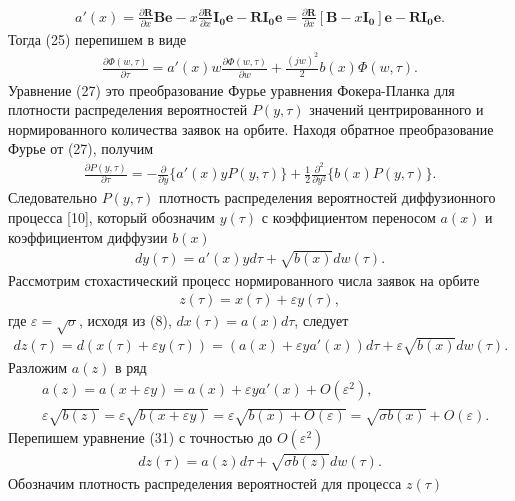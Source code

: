 \begin{align*}
	a'(x)=\frac{\partial \boldsymbol{R}}{\partial x}\boldsymbol{Be}-x\frac{\partial \boldsymbol{R}}{\partial x}\boldsymbol{I_{0}} \boldsymbol{e}-\boldsymbol{RI_{0}e}=\frac{\partial \boldsymbol{R}}{\partial x}[\boldsymbol{B}-x\boldsymbol{I_{0}}] \boldsymbol{e}-\boldsymbol{RI_{0}e}.
\end{align*}
Тогда (25) перепишем в виде
\begin{align}
	\frac{\partial \Phi (w,\tau)}{\partial \tau}=a'(x) w\frac{\partial \Phi (w,\tau)}{\partial w}+\frac{(jw)^2}{2}b(x)\Phi(w,\tau).
\end{align}
Уравнение (27) это преобразование Фурье уравнения Фокера-Планка для плотности распределения вероятностей $P(y, \tau )$ значений центрированного и нормированного количества заявок на орбите. Находя обратное преобразование Фурье от (27), получим
\begin{align}
	\frac{\partial P (y,\tau)}{\partial \tau}=-\frac{\partial}{\partial y}\{a'(x)yP(y,\tau)\} 
	+\frac{1}{2}\frac{\partial^2}{\partial y^2}\{b(x)P(y,\tau)\}.
\end{align}
Следовательно $P (y,\tau)$ плотность распределения вероятностей диффузионного процесса [10], который обозначим $y(\tau)$ с коэффициентом переносом $a(x)$ и коэффициентом диффузии $b(x)$
\begin{align}
	dy(\tau)=a'(x)yd\tau+\sqrt{b(x)}dw(\tau).
\end{align}
Рассмотрим стохастический процесс нормированного числа заявок на орбите
\begin{align}
	z(\tau)=x(\tau)+\varepsilon y(\tau),
\end{align}
где $\varepsilon=\sqrt{\sigma}$, исходя из (8), $dx(\tau)=a(x)d\tau$, следует
\begin{align}
	dz(\tau)=d(x(\tau)+\varepsilon y(\tau))=(a(x)+\varepsilon ya'(x))d\tau+\varepsilon \sqrt{b(x)}dw(\tau).
\end{align}
Разложим $a(z)$ в ряд 
\begin{align*}
	&a(z)=a(x+\varepsilon y)=a(x)+\varepsilon y a'(x)+O(\varepsilon^2),\\
	&\varepsilon\sqrt{b(z)}=\varepsilon\sqrt{b(x+\varepsilon y)}=\varepsilon\sqrt{b(x)+O(\varepsilon)}=\sqrt{\sigma b(x)}+O(\varepsilon).
\end{align*}
Перепишем уравнение (31) с точностью до $O(\varepsilon^2)$
\begin{align}
	dz(\tau)=a(z)d\tau+\sqrt{\sigma b(z)}dw(\tau).
\end{align}
Обозначим плотность распределения вероятностей для процесса $z(\tau)$
